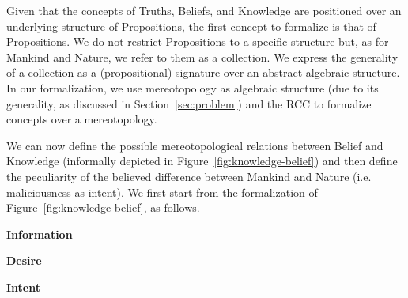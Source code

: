 
Given that the concepts of Truths, Beliefs, and Knowledge are positioned over
an underlying structure of Propositions, the first concept to formalize is that
of Propositions. We do not restrict Propositions to a specific structure but,
as for Mankind and Nature, we refer to them as a collection.  We express the
generality of a collection as a (propositional) signature over an abstract
algebraic structure. In our formalization, we use mereotopology as algebraic
structure (due to its generality, as discussed in Section~\ref{sec:problem})
and the RCC to formalize concepts over a mereotopology. 

We can now define the possible mereotopological relations between Belief and
Knowledge (informally depicted in Figure~\ref{fig:knowledge-belief}) and then
define the peculiarity of the believed difference between Mankind and Nature 
(i.e. maliciousness as intent). 
We first start from the formalization of Figure~\ref{fig:knowledge-belief}, as
follows.  

\begin{definition}{\bf Information}\label{def:information}
\end{definition}
\begin{definition}{\bf Desire}\label{def:desire}
\end{definition}
\begin{definition}{\bf Intent}\label{def:intent}
\end{definition}
